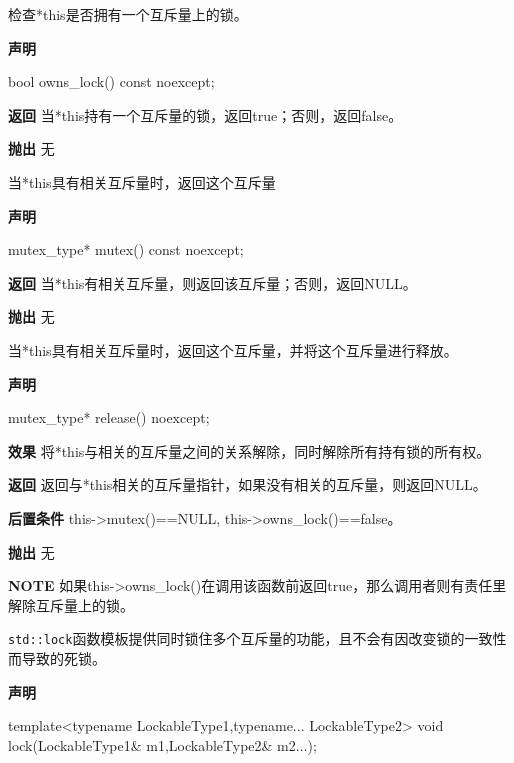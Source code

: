 
检查*this是否拥有一个互斥量上的锁。

\textbf{声明}

\begin{cpp}
bool owns_lock() const noexcept;
\end{cpp}

\textbf{返回}
当*this持有一个互斥量的锁，返回true；否则，返回false。

\textbf{抛出}
无


当*this具有相关互斥量时，返回这个互斥量

\textbf{声明}

\begin{cpp}
mutex_type* mutex() const noexcept;
\end{cpp}

\textbf{返回}
当*this有相关互斥量，则返回该互斥量；否则，返回NULL。

\textbf{抛出}
无


当*this具有相关互斥量时，返回这个互斥量，并将这个互斥量进行释放。

\textbf{声明}

\begin{cpp}
mutex_type* release() noexcept;
\end{cpp}

\textbf{效果}
将*this与相关的互斥量之间的关系解除，同时解除所有持有锁的所有权。

\textbf{返回}
返回与*this相关的互斥量指针，如果没有相关的互斥量，则返回NULL。

\textbf{后置条件}
this->mutex()==NULL, this->owns\_lock()==false。

\textbf{抛出}
无

\textbf{NOTE} 如果this->owns\_lock()在调用该函数前返回true，那么调用者则有责任里解除互斥量上的锁。


\texttt{std::lock}函数模板提供同时锁住多个互斥量的功能，且不会有因改变锁的一致性而导致的死锁。

\textbf{声明}

\begin{cpp}
template<typename LockableType1,typename... LockableType2>
void lock(LockableType1& m1,LockableType2& m2...);
\end{cpp}

